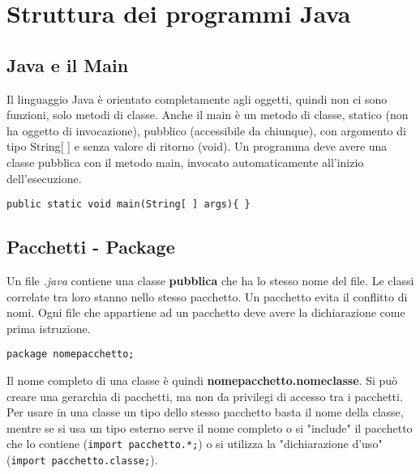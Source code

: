 \chapter{Struttura dei programmi Java}

\section{Java e il Main}
Il linguaggio Java è orientato completamente agli oggetti, quindi non ci sono funzioni, solo metodi di classe. Anche il main è un metodo di classe, statico (non ha oggetto di invocazione), pubblico (accessibile da chiunque), con argomento di tipo String[ ] e senza valore di ritorno (void).
Un programma deve avere una classe pubblica con il metodo main, invocato automaticamente all'inizio dell'esecuzione.
\begin{verbatim}
public static void main(String[ ] args){ }
\end{verbatim}

\section{Pacchetti - Package}
Un file \textit{.java} contiene una classe \textbf{pubblica} che ha lo stesso nome del file. Le classi correlate tra loro stanno nello stesso pacchetto. Un pacchetto evita il conflitto di nomi.
Ogni file che appartiene ad un pacchetto deve avere la dichiarazione come prima istruzione.
\begin{verbatim}
package nomepacchetto;
\end{verbatim}
Il nome completo di una classe è quindi \textbf{nomepacchetto.nomeclasse}.
Si può creare una gerarchia di pacchetti, ma non da privilegi di accesso tra i pacchetti.
Per usare in una classe un tipo dello stesso pacchetto basta il nome della classe, mentre se si usa un tipo esterno serve il nome completo o si "include" il pacchetto che lo contiene (\texttt{import pacchetto.*;}) o si utilizza la "dichiarazione d'uso" (\texttt{import pacchetto.classe;}).
